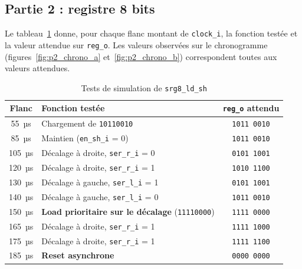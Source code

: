 \subsection{Partie 2 : registre 8 bits}

Le tableau~\ref{tab:p2_tests} donne, pour chaque flanc montant de
\texttt{clock\_i}, la fonction testée et la valeur attendue sur \texttt{reg\_o}.
Les valeurs observées sur le chronogramme (figures~\ref{fig:p2_chrono_a} et~\ref{fig:p2_chrono_b})
correspondent toutes aux valeurs attendues.

\begin{table}[H]
  \centering
  \begin{tabular}{c l c}
    \hline
    \textbf{Flanc} & \textbf{Fonction testée} & \textbf{\texttt{reg\_o} attendu} \\
    \hline
    55~µs  & Chargement de \texttt{10110010}                    & \texttt{1011 0010} \\
    85~µs  & Maintien (\texttt{en\_sh\_i} = 0)                  & \texttt{1011 0010} \\
    105~µs & Décalage à droite, \texttt{ser\_r\_i} = 0          & \texttt{0101 1001} \\
    120~µs & Décalage à droite, \texttt{ser\_r\_i} = 1          & \texttt{1010 1100} \\
    130~µs & Décalage à gauche, \texttt{ser\_l\_i} = 1          & \texttt{0101 1001} \\
    140~µs & Décalage à gauche, \texttt{ser\_l\_i} = 0          & \texttt{1011 0010} \\
    150~µs & \textbf{Load prioritaire sur le décalage} (\texttt{11110000}) & \texttt{1111 0000} \\
    165~µs & Décalage à droite, \texttt{ser\_r\_i} = 1          & \texttt{1111 1000} \\
    175~µs & Décalage à droite, \texttt{ser\_r\_i} = 1          & \texttt{1111 1100} \\
    185~µs & \textbf{Reset asynchrone}      & \texttt{0000 0000} \\
    \hline
  \end{tabular}
  \caption{Tests de simulation de \texttt{srg8\_ld\_sh}}
  \label{tab:p2_tests}
\end{table}


